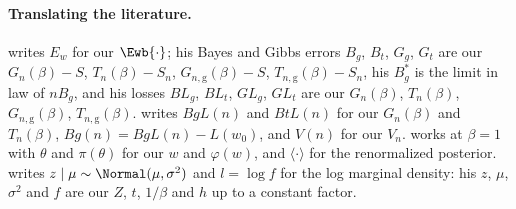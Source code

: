\begin{refsection}
\paragraph{Translating the literature.} \Textcite{Watanabe2010a} writes $E_w$ for our $\Ewb{\cdot}$; his Bayes and Gibbs errors $B_g$, $B_t$, $G_g$, $G_t$ are our $G_n(\beta)-S$, $T_n(\beta)-S_n$, $G_{n,\mathrm g}(\beta)-S$, $T_{n,\mathrm g}(\beta)-S_n$, his $B_g^*$ is the limit in law of $nB_g$, and his losses $BL_g$, $BL_t$, $GL_g$, $GL_t$ are our $G_n(\beta)$, $T_n(\beta)$, $G_{n,\mathrm g}(\beta)$, $T_{n,\mathrm g}(\beta)$. \Textcite{Watanabe2010} writes $BgL(n)$ and $BtL(n)$ for our $G_n(\beta)$ and $T_n(\beta)$, $Bg(n)=BgL(n)-L(w_0)$, and $V(n)$ for our $V_n$. \Textcite{Watanabe2024} works at $\beta=1$ with $\theta$ and $\pi(\theta)$ for our $w$ and $\varphi(w)$, and $\langle\cdot\rangle$ for the renormalized posterior. \Textcite{Efron2011} writes $z\mid\mu\sim\Normal(\mu,\sigma^2)$ and $l=\log f$ for the log marginal density: his $z$, $\mu$, $\sigma^2$ and $f$ are our $Z$, $t$, $1/\beta$ and $h$ up to a constant factor.

\printchapterbib
\end{refsection}
